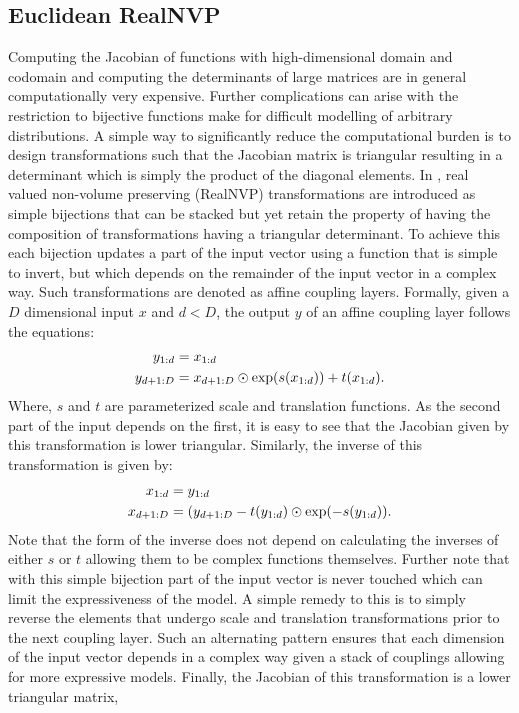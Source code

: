 \subsection{Euclidean RealNVP}
\label{Euclidean_RealNVP_appendix}
Computing the Jacobian of functions with high-dimensional domain and codomain and computing the determinants of large matrices are in general computationally very expensive. Further complications can arise with the restriction to bijective functions make for difficult modelling of arbitrary distributions. A simple way to significantly reduce the computational burden is to design transformations such that the Jacobian matrix is triangular resulting in a determinant which is simply the product of the diagonal elements. In \cite{dinh2016density}, real valued non-volume preserving (RealNVP) transformations are introduced as simple bijections that can be stacked but yet retain the property of having the composition of transformations having a triangular determinant. To achieve this each bijection updates a part of the input vector using a function that is simple to invert,
but which depends on the remainder of the input vector in a complex way. Such transformations are denoted  as affine coupling layers. Formally, given a $D$ dimensional input $x$ and $d < D$, the output $y$ of an affine coupling layer follows the equations:
\begin{align}
    y_{1:d} & = x_{1:d} \\
    y_{d+1:D} & = x_{d+1:D} \odot \textnormal{exp}(s(x_{1:d})) + t(x_{1:d}).
\end{align}
Where, $s$ and $t$ are parameterized scale and translation functions. As the second part of the input depends on the first, it is easy to see that the Jacobian given by this transformation is lower triangular. Similarly, the inverse of this transformation is given by:
\begin{align}
     x_{1:d} & = y_{1:d} \\
    x_{d+1:D} & = (y_{d+1:D} - t(y_{1:d})\odot \textnormal{exp}(-s(y_{1:d})).
\end{align}
Note that the form of the inverse does not depend on calculating the inverses of either $s$ or $t$ allowing them to be complex functions themselves. Further note that with this simple bijection part of the input vector is never touched which can limit the expressiveness of the model. A simple remedy to this is to simply reverse the elements that undergo scale and translation transformations prior to the next coupling layer. Such an alternating pattern ensures that each dimension of the input vector depends in a complex way given a stack of couplings allowing for more expressive models. Finally, the Jacobian of this transformation is a lower triangular matrix,
